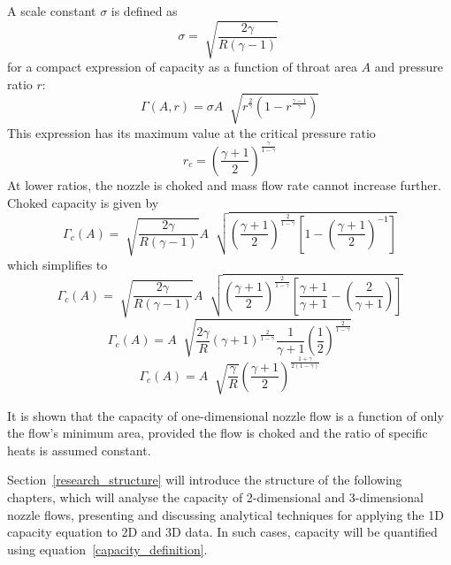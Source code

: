\documentclass[a4paper, 11pt, twoside]{report}
\begin{document}
A scale constant $\sigma$ is defined as
\begin{equation}
\sigma = 
\sqrt[]{\frac{2\gamma}{R\left(\gamma-1\right)}} \;
\end{equation}
for a compact expression of capacity as a function of throat area $A$ and pressure ratio $r$:
\begin{equation}
\Gamma \left( A, r \right) = 
\sigma
A \;
\sqrt[]{
	r^\frac{2}{\gamma}
	\left(
		1 - r ^\frac{\gamma-1}{\gamma}
	\right) 
}
\end{equation}
This expression has its maximum value at the critical pressure ratio
\begin{equation}
r_c =
\left(
	\frac{\gamma+1}{2}
\right)
^\frac{\gamma}{1-\gamma}
\end{equation}
At lower ratios, the nozzle is choked and mass flow rate cannot increase further. Choked capacity is given by
\begin{equation}\label{choked_capacity_from_area}
\Gamma_c \left( A \right) =
\sqrt[]{\frac{2\gamma}{R\left(\gamma-1\right)}}
A \;
\sqrt[]{
	\left(
		\frac{\gamma+1}{2}  
	\right)
	^\frac{2}{1-\gamma}
	\left[
		1 - 
		\left(
			\frac{\gamma+1}{2}
		\right)
		^{-1}
	\right]
}
\end{equation}
which simplifies to
\begin{equation}\label{choked_capacity_from_area}
\Gamma_c \left( A \right) =
\sqrt[]{\frac{2\gamma}{R\left(\gamma-1\right)}}
A \;
\sqrt[]{
	\left(
		\frac{\gamma+1}{2}  
	\right)
	^\frac{2}{1-\gamma}
	\left[
		\frac{\gamma+1}{\gamma+1}
		-
		\left(
			\frac{2}{\gamma+1}
		\right)
	\right]
}
\end{equation}
\begin{equation}\label{choked_capacity_from_area}
\Gamma_c \left( A \right) =
A \;
\sqrt[]{
	\frac{2\gamma}{R}
	\left(
		\gamma+1
	\right)
	^\frac{2}{1-\gamma}
	\frac{1}{\gamma+1}
	\left(
		\frac{1}{2}
	\right)
	^\frac{2}{1-\gamma}
}
\end{equation}
\begin{equation}\label{choked_capacity_from_area}
\Gamma_c \left( A \right) =
A \;
\sqrt[]{
	\frac{\gamma}{R}
}
\left(
	\frac{\gamma+1}{2}
\right)
^\frac{1+\gamma}{2\left(1-\gamma\right)}
\end{equation}

It is shown that the capacity of one-dimensional nozzle flow is a function of only the flow's minimum area, provided the flow is choked and the ratio of specific heats is assumed constant. 

Section~\ref{research_structure} will introduce the structure of the following chapters, which will analyse the capacity of 2-dimensional and 3-dimensional nozzle flows, presenting and discussing analytical techniques for applying the 1D capacity equation to 2D and 3D data. In such cases, capacity will be quantified using equation~\ref{capacity_definition}.
\end{document}
